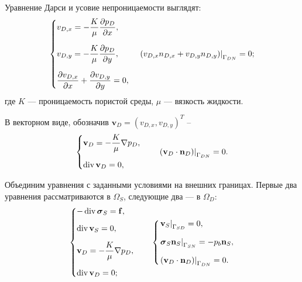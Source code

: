 \documentclass[a4paper,14pt]{extarticle}
\begin{document}
\begin{tcolorbox}
	Уравнение Дарси и усовие непроницаемости выглядят:
	\begin{equation}
		\begin{dcases}
			v_{D,x}
			=
			-\dfrac{K}{\mu}
			\dfrac{\partial p_D}{\partial x},
			\\[6pt]
			v_{D,y}
			=
			-\dfrac{K}{\mu}
			\dfrac{\partial p_D}{\partial y},
			\\[6pt]
			\dfrac{\partial v_{D,x}}{\partial x}
			+
			\dfrac{\partial v_{D,y}}{\partial y}
			=
			0,
		\end{dcases}
		\quad
		\left.
		\left(
			v_{D,x}n_{D,x}
			+
			v_{D,y}n_{D,y}
		\right)
		\right|_{\Gamma_{DN}}
		=
		0;
	\end{equation}
	где $K$ --- проницаемость пористой среды, $\mu$ ---
	вязкость жидкости.

	В векторном виде, обозначив
	$\mathbf v_D=(v_{D,x},v_{D,y})^T$ -- 
	\begin{equation}
		\begin{dcases}
			\mathbf v_D
			=
			-\dfrac{K}{\mu}\nabla p_D,
			\\[6pt]
			\operatorname{div}\mathbf v_D=0,
		\end{dcases}
		\qquad
		\left.
		(\mathbf v_D\cdot\mathbf n_D)
		\right|_{\Gamma_{DN}}
		=0.
	\end{equation}
\end{tcolorbox}


Объединим уравнения с заданными условиями на внешних
границах. Первые два уравнения рассматриваются в $\Omega_S$,
следующие два --- в $\Omega_D$:
\begin{equation}
	\begin{dcases}
		-\operatorname{div}\boldsymbol\sigma_S
		=
		\mathbf f,
		\\[6pt]
		\operatorname{div}\mathbf v_S=0,
		\\[6pt]
		\mathbf v_D
		=
		-\dfrac{K}{\mu}\nabla p_D,
		\\[6pt]
		\operatorname{div}\mathbf v_D=0;
	\end{dcases}
	\qquad
	\begin{dcases}
		\left.\mathbf v_S\right|_{\Gamma_{SD}}=0,
		\\[6pt]
		\left.
		\boldsymbol\sigma_S\mathbf n_S
		\right|_{\Gamma_{SN}}
		=
		-p_b\mathbf n_S,
		\\[6pt]
		\left.
		(\mathbf v_D\cdot\mathbf n_D)
		\right|_{\Gamma_{DN}}
		=0.
	\end{dcases}
	\label{eq:stokes_darcy_outer}
\end{equation}
\end{document}
